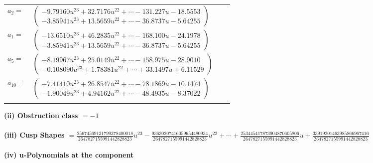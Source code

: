 \documentclass[1p]{elsarticle_modified}
\theoremstyle{definition}
\begin{document}
\begin{tabular}{m{7pt} m{180pt} m{7pt} m{180pt} }
\flushright $a_{2}=$&$\begin{pmatrix}-9.79160 u^{23}+32.7176 u^{22}+\cdots-131.227 u-18.5553\\-3.85941 u^{23}+13.5659 u^{22}+\cdots-36.8737 u-5.64255\end{pmatrix}$ \\
\flushright $a_{1}=$&$\begin{pmatrix}-13.6510 u^{23}+46.2835 u^{22}+\cdots-168.100 u-24.1978\\-3.85941 u^{23}+13.5659 u^{22}+\cdots-36.8737 u-5.64255\end{pmatrix}$ \\
\flushright $a_{5}=$&$\begin{pmatrix}-8.19967 u^{23}+25.0149 u^{22}+\cdots-158.975 u-28.9010\\-0.108090 u^{23}+1.78381 u^{22}+\cdots+33.1497 u+6.11529\end{pmatrix}$ \\
\flushright $a_{10}=$&$\begin{pmatrix}-7.41410 u^{23}+26.8547 u^{22}+\cdots-78.1869 u-10.1474\\-1.90049 u^{23}+4.94162 u^{22}+\cdots-48.4935 u-8.37022\end{pmatrix}$\\&\end{tabular}
\flushleft \textbf{(ii) Obstruction class $= -1$}\\~\\
\flushleft \textbf{(iii) Cusp Shapes $= \frac{25674569131799378400018}{2647827155991442828823} u^{23}-\frac{93630207416059654480934}{2647827155991442828823} u^{22}+\cdots+\frac{253445417873904870605806}{2647827155991442828823} u+\frac{33919201463985866967416}{2647827155991442828823}$}\\~\\
\newpage\renewcommand{\arraystretch}{1}
\flushleft \textbf{(iv) u-Polynomials at the component}\newline \\
\end{document}
